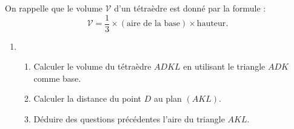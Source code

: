 On rappelle que le volume $\mathcal{V}$ d'un tétraèdre est donné par la formule : \[\mathcal{V} = \dfrac{1}{3}\times  (\text{aire de la base}) \times \text{hauteur}.\]
%
\begin{enumerate}[resume]
	\item 
	\begin{enumerate}
		\item Calculer le volume du tétraèdre $ADKL$ en utilisant le triangle $ADK$ comme base. 
		\item Calculer la distance du point $D$ au plan $(AKL)$.
		\item Déduire des questions précédentes l'aire du triangle $AKL$.
	\end{enumerate}
\end{enumerate}

